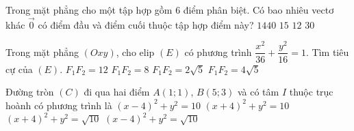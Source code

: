 \begin{ex}%
	Trong mặt phẳng cho một tập hợp gồm $6$ điểm phân biệt. Có bao nhiêu vectơ khác $\overrightarrow{0}$ có điểm đầu và điểm cuối thuộc tập hợp điểm này?
	\choice
	{$1440$}
	{$15$}
	{$12$}
	{\True $30$}
\end{ex}
\begin{ex}%
	Trong mặt phẳng $(Oxy)$, cho elip $(E)$ có phương trình $\dfrac{x^2}{36}+\dfrac{y^2}{16}=1$. Tìm tiêu cự của $(E)$.
	\choice
	{$F_1 F_2=12$}
	{$F_1 F_2=8$}
	{$F_1 F_2=2 \sqrt{5}$}
	{\True $F_1 F_2=4 \sqrt{5}$}
\end{ex}
\begin{ex}%
Đường tròn $(C)$ đi qua hai điểm $A(1 ; 1)$, $B(5 ; 3)$ và có tâm $I$ thuộc trục hoành có phương trình là
\choice
{\True $(x-4)^2+y^2=10$}
{$(x+4)^2+y^2=10$}
{$(x+4)^2+y^2=\sqrt{10}$}
{$(x-4)^2+y^2=\sqrt{10}$}
\end{ex}







